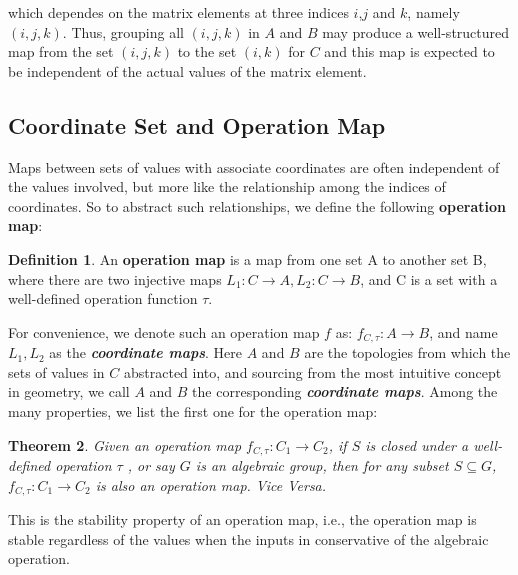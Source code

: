 \documentclass{amsart}
\newtheorem{theorem}{Theorem}[section]
\theoremstyle{definition}
\newtheorem{definition}[theorem]{Definition}
\theoremstyle{remark}
\numberwithin{equation}{section}
\begin{document}
which dependes on the matrix elements at three indices $i$,$j$ and $k$, namely $(i,j,k)$. Thus, grouping all $(i,j,k)$ in $A
$ and $B$ may produce a well-structured map from the set $(i,j,k)$ to the set $(i,k)$ for $C$ and this map is expected to be independent of the actual values of the matrix element.




\subsection{Coordinate Set and Operation Map}
Maps between sets of values with associate coordinates are often independent of the values involved, but more like the relationship among the indices of coordinates. So to abstract such relationships, we define the following \textbf{operation map}:

\begin{definition}
An \textbf{operation map} is a map from one set A to another set B, where there are two injective maps $L_1:C\to A, L_2:C\to B$, and C is a set with a well-defined operation function $\tau$.
\end{definition}

For convenience, we denote such an operation map $f$ as: $f_{C,\tau}:A\to B$, and name $L_1,L_2$ as the \emph{\textbf{coordinate maps}}. Here $A$ and $B$ are the topologies from which the sets of values in $C$ abstracted into, and sourcing from the most intuitive concept in geometry, we call $A$ and $B$ the corresponding \emph{\textbf{coordinate maps}}. Among the many properties, we list the first one for the operation map:
\begin{theorem}
Given an operation map $f_{C,\tau}:C_1\to C_2$, if $S$ is closed under a well-defined operation $\tau$ , or say $G$ is an algebraic group, then for any subset $S\subseteq G$, $f_{C,\tau}:C_1\to C_2$ is also an operation map. Vice Versa.
\end{theorem}
This is the stability property of an operation map, i.e., the operation map is stable regardless of the values when the inputs in conservative of the algebraic operation.\par
\end{document}
